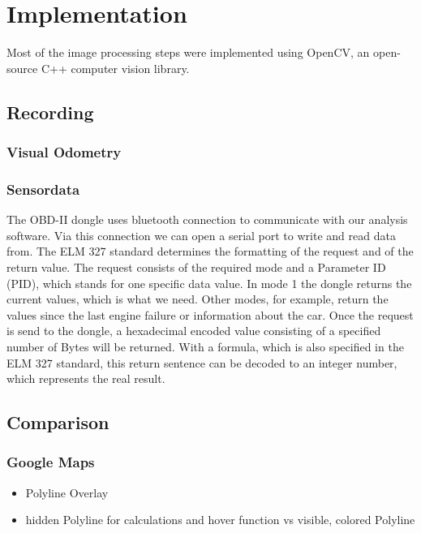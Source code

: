 \section{Implementation}
\label{sec:implementation}

Most of the image processing steps were implemented using OpenCV, an open-source C++ computer vision library. 

\subsection{Recording}
\subsubsection{Visual Odometry}
\subsubsection{Sensordata}
The OBD-II dongle uses bluetooth connection to communicate with our analysis software. Via this connection we can open a serial port to write and read data from.
The ELM 327 standard determines the formatting of the request and of the return value.
The request consists of the required mode and a Parameter ID (PID), which stands for one specific data value. In mode 1 the dongle returns the current values, which is what we need. Other modes, for example, return the values since the last engine failure or information about the car.
Once the request is send to the dongle, a hexadecimal encoded value consisting of a specified number of Bytes will be returned. With a formula, which is also specified in the ELM 327 standard, this return sentence can be decoded to an integer number, which represents the real result.

\subsection{Comparison}
\subsubsection{Google Maps}
\begin{itemize}
	\item Polyline Overlay
	\item hidden Polyline for calculations and hover function vs visible, colored Polyline	
\end{itemize}
\clearpage